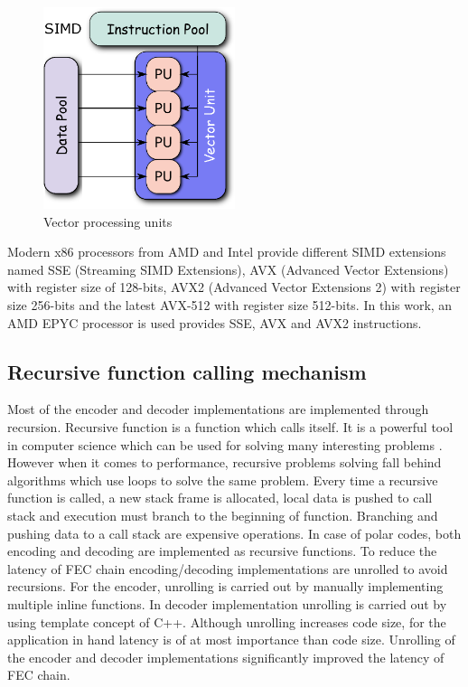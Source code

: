 \begin{figure}[h]
	\centering
	\includegraphics[width=0.5\textwidth]{./figures/SIMD2.eps}
	\caption{Vector processing units \cite{SIMDWiki}}
	\label{fig:simdUnits}
\end{figure}

Modern x86 processors from AMD and Intel provide different SIMD extensions named SSE (Streaming SIMD Extensions), AVX (Advanced Vector Extensions) with register size of 128-bits, AVX2 (Advanced Vector Extensions 2) with register size 256-bits and the latest AVX-512 with register size 512-bits. In this work, an AMD EPYC processor is used provides SSE, AVX and AVX2 instructions.


\subsection{Recursive function calling mechanism}
Most of the encoder and decoder implementations are implemented through recursion. Recursive function is a function which calls itself. It is a powerful tool in computer science which can be used for solving many interesting problems \cite{CLRS}. However when it comes to performance, recursive problems solving fall behind algorithms which use loops to solve the same problem. Every time a recursive function is called, a new stack frame is allocated, local data is pushed to call stack and execution must branch to the beginning of function. Branching and pushing data to a call stack are expensive operations. In case of polar codes, both encoding and decoding are implemented as recursive functions. To reduce the latency of FEC chain encoding/decoding implementations are unrolled to avoid recursions. For the encoder, unrolling is carried out by manually implementing multiple inline functions. In decoder implementation unrolling is carried out by using template concept of C++. Although unrolling increases code size, for the application in hand latency is of at most importance than code size. Unrolling of the encoder and decoder implementations significantly improved the latency of FEC chain. 